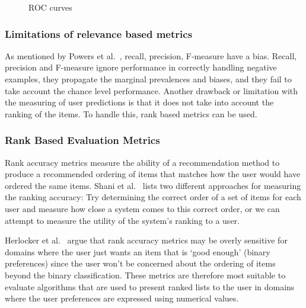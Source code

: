 \begin{figure}[H]
\label{fig:aucroc}
  \centering
    \caption{ROC curves}
\end{figure}

\subsubsection{Limitations of relevance based metrics}
\label{subsec:limitations-relevancebased}

As mentioned by Powers et al.~\cite{powers2007}, recall, precision, F-measure
have a bias.  Recall, precision and F-measure ignore performance in correctly
handling negative examples, they propagate the marginal prevalences and biases,
and they fail to take account the chance level performance.  Another drawback
or limitation with the measuring of user predictions is that it does not take
into account the ranking of the items. To handle this, rank based metrics can
be used.

\subsubsection{Rank Based Evaluation Metrics}
\label{subsec:rankbased}

Rank accuracy metrics measure the ability of a recommendation method to produce
a recommended ordering of items that matches how the user would have ordered
the same items. Shani et al.~\cite{Shani2011} lists two different approaches
for measuring the ranking accuracy: Try determining the correct order of a set
of items for each user and measure how close a system comes to this correct
order, or we can attempt to measure the utility of the system's ranking to a
user.

Herlocker et al.~\cite{Herlocker2004} argue that rank accuracy metrics may be
overly sensitive for domains where the user just wants an item that is `good
enough' (binary preferences) since the user won't be concerned about the
ordering of items beyond the binary classification. These metrics are therefore
most suitable to evaluate algorithms that are used to present ranked lists to
the user in domains where the user preferences are expressed using numerical
values.

